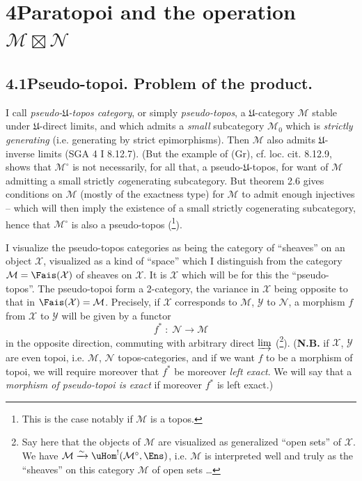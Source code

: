 

\section*{4\quad Paratopoi and the operation $\mathcal{M}\boxtimes\mathcal{N}$}

\subsection*{4.1\quad Pseudo-topoi. Problem of the product.}

I call \textit{pseudo-$\mathfrak{U}$-topos category}, or simply \textit{pseudo-topos}, a $\mathfrak{U}$-category $\mathcal{M}$ stable under $\mathfrak{U}$-direct limits, and which admits a \textit{small} subcategory $\mathcal{M}_0$ which is \textit{strictly generating} (i.e. generating by strict epimorphisms). Then $\mathcal{M}$ also admits $\mathfrak{U}$-inverse limits (SGA 4 I 8.12.7). (But the example of (Gr), cf. loc. cit. 8.12.9, shows that $\mathcal{M}^\circ$ is not necessarily, for all that, a pseudo-$\mathfrak{U}$-topos, for want of $\mathcal{M}$ admitting a small strictly \textit{co}generating subcategory. But theorem 2.6 gives conditions on $\mathcal{M}$ (mostly of the exactness type) %
for $\mathcal{M}$ to admit enough injectives -- which will then imply the existence of a small strictly cogenerating subcategory, hence that $\mathcal{M}^\circ$ is also a pseudo-topos (\footnote{This is the case notably if $\mathcal{M}$ is a topos.}).

I visualize the pseudo-topos categories as being the category of ``sheaves'' on an object $\mathcal{X}$, visualized as a kind of ``space'' which I distinguish from the category $\mathcal{M}=\Fais(\mathcal{X})$ of sheaves on $\mathcal{X}$. It is $\mathcal{X}$ which will be for this the ``pseudo-topos''. The pseudo-topoi form a 2-category, the variance in $\mathcal{X}$ being opposite to that in $\Fais(\mathcal{X})=\mathcal{M}$. Precisely, if $\mathcal{X}$ corresponds to $\mathcal{M}$, $\mathcal{Y}$ to $\mathcal{N}$, a morphism $f$ from $\mathcal{X}$ to $\mathcal{Y}$ will be given by a functor
\[
f^* \;:\; \mathcal{N} \longrightarrow \mathcal{M}
\tag*{(4.1.1)}
\]
in the opposite direction, commuting with arbitrary direct $\varinjlim$ (\footnote{Say here that the objects of $\mathcal{M}$ are visualized as generalized ``open sets'' of $\mathcal{X}$. We have $\mathcal{M}\xrightarrow{\sim}\uHom^!(\mathcal{M}^\circ,\Ens)$, i.e. $\mathcal{M}$ is interpreted well and truly as the ``sheaves'' on this category $\mathcal{M}$ of open sets \ldots}). (\textbf{N.B.} if $\mathcal{X}$, $\mathcal{Y}$ are even topoi, i.e. $\mathcal{M}$, $\mathcal{N}$ topos-categories, and if we want $f$ to be a morphism of topoi, we will require moreover that $f^*$ be moreover \textit{left exact}. We will say that a \textit{morphism of pseudo-topoi is exact} if moreover $f^*$ is left exact.)

